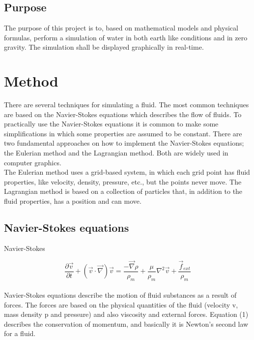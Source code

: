 \documentclass[a4paper,12pt,twoside]{report}
\begin{document}
\section{Purpose}
The purpose of this project is to, based on mathematical models and physical formulas, perform a simulation of water in both earth like conditions and in zero gravity. The simulation shall be displayed graphically in real-time.

\chapter{Method}
There are several techniques for simulating a fluid. The most common techniques are based on the Navier-Stokes equations which describes the flow of fluids. To practically use the Navier-Stokes equations it is common to make some simplifications in which some properties are assumed to be constant. There are two fundamental approaches on how to implement the Navier-Stokes equations; the Eulerian method and the Lagrangian method. Both are widely used in computer graphics. \\

\noindent The Eulerian method uses a grid-based system, in which each grid point has fluid properties, like velocity, density, pressure, etc., but the points never move.
The Lagrangian method is based on a collection of particles that, in addition to the fluid properties, has a position and can move.


\section{Navier-Stokes equations}

Navier-Stokes

\begin{equation}
\frac{\partial \overrightarrow v}{\partial t} + ({\overrightarrow v}\cdot{\overrightarrow \nabla}){\overrightarrow v} = \frac{-\overrightarrow \nabla \rho}{\rho_m} + \frac{\mu}{\rho_m}{ \nabla^2}{\overrightarrow v} + \frac{\overrightarrow f_{ext}}{\rho_m}
\end{equation} \\

\noindent Navier-Stokes equations describe the motion of fluid substances as a result of forces. The forces are based on the physical quantities of the fluid (velocity v, mass density p and pressure) and also viscosity and external forces. Equation (1) describes the conservation of momentum, and basically it is Newton’s second law for a fluid.
\end{document}
